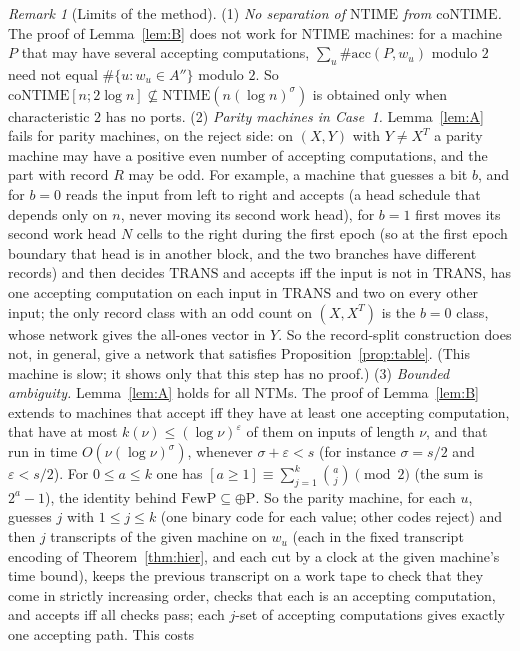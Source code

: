 \documentclass[11pt]{article}
\theoremstyle{definition}
\theoremstyle{remark}
\newtheorem{remark}[theorem]{Remark}
\newcommand{\NTIME}{\mathrm{NTIME}}
\newcommand{\coNTIME}{\mathrm{coNTIME}}
\newcommand{\TRANS}{\mathrm{TRANS}}
\newcommand{\acc}{\#\mathrm{acc}}
\begin{document}
\begin{remark}[Limits of the method]
(1) \emph{No separation of $\NTIME$ from $\coNTIME$.} The proof of Lemma~\ref{lem:B} does not work for NTIME machines: for a
machine $P$ that may have several accepting computations, $\sum_u\acc(P,w_u)$ modulo $2$ need not equal $\#\{u:w_u\in A''\}$
modulo $2$. So
$\coNTIME[n;2\log n]\not\subseteq\NTIME(n(\log n)^{\sigma})$ is obtained only when characteristic $2$ has no ports.
(2) \emph{Parity machines in Case~1.} Lemma~\ref{lem:A} fails for parity machines, on the reject side: on $(X,Y)$ with $Y\ne X^T$ a
parity machine may have a positive even number of accepting computations, and the part with record $R$ may be odd. For example, a
machine that guesses a bit $b$, and for $b=0$ reads the input from left to right and accepts (a head schedule that depends only on
$n$, never moving its second work head), for $b=1$ first moves its second work head $N$ cells to the right during the first epoch
(so at the first epoch boundary that head is in another block, and the two branches have different records) and then decides
$\TRANS$ and accepts iff the input is not in $\TRANS$, has one accepting computation on each input in $\TRANS$ and two on every other input; the only record class
with an odd count on $(X,X^T)$ is the $b=0$ class, whose network gives the all-ones vector in $Y$. So the record-split construction
does not, in general, give a network that satisfies Proposition~\ref{prop:table}. (This machine is slow; it shows only that this
step has no proof.)
(3) \emph{Bounded ambiguity.} Lemma~\ref{lem:A} holds for all NTMs. The proof of Lemma~\ref{lem:B} extends to machines that
accept iff they have at least one accepting computation, that have at most $k(\nu)\le(\log\nu)^{\varepsilon}$ of them on inputs of
length $\nu$, and that run in time $O(\nu(\log\nu)^{\sigma})$, whenever $\sigma+\varepsilon<s$ (for instance $\sigma=s/2$ and
$\varepsilon<s/2$). For $0\le a\le k$ one has $[a\ge1]\equiv\sum_{j=1}^{k}\binom aj\pmod2$
(the sum is $2^a-1$), the identity behind $\mathrm{FewP}\subseteq\oplus\mathrm P$. So the parity machine, for each $u$, guesses
$j$ with $1\le j\le k$ (one binary code for each value; other codes reject) and then $j$ transcripts of the given machine on $w_u$ (each in the fixed transcript encoding of
Theorem~\ref{thm:hier}, and each cut by a clock at the given machine's time bound), keeps the previous transcript on a work tape to check that they come in strictly increasing order, checks
that each is an accepting computation, and accepts iff all checks pass; each $j$-set of accepting computations gives exactly one accepting path. This costs

\end{remark}
\end{document}
